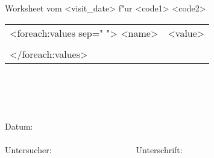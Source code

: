 \documentclass{scrreprt}
\begin{document}
\noindent Worksheet {\it <Voller Titel>} vom <visit_date> f"ur <code1> <code2> \\

\begin{mpsupertabular}{p{5cm}p{9cm}}
\hline
 <foreach:values sep=" ">
<name> &<value>\\
\tabularnewline
</foreach:values>
\hline
\end{mpsupertabular}
~
\\\\ \\\\
\noindent Datum:\\\\
\noindent Untersucher:~~~~~~~~~~~~~~~~~~~~Unterschrift:
\end{document}
